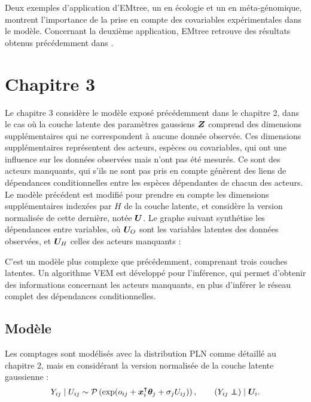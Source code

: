 Deux exemples d'application d'EMtree, un en écologie et un en méta-génomique, montrent l'importance de la prise en compte des covariables expérimentales dans le modèle. Concernant la deuxième application, EMtree retrouve des résultats obtenus précédemment dans \citet{jakuch}.


\section*{Chapitre 3}
Le chapitre 3 considère le modèle exposé précédemment dans le chapitre 2, dans le cas où la couche latente des paramètres gaussiens ${\boldsymbol{Z}}$ comprend des dimensions supplémentaires qui ne correspondent à aucune donnée observée. Ces dimensions supplémentaires représentent des acteurs, espèces ou covariables, qui ont une influence sur les données observées mais n'ont pas été mesurés. Ce sont des acteurs manquants, qui s'ils ne sont pas pris en compte génèrent des liens de dépendances conditionnelles entre les espèces dépendantes de chacun des acteurs. Le modèle précédent est modifié pour prendre en compte les dimensions supplémentaires indexées par $H$ de la couche latente, et considère la version normalisée de cette dernière, notée ${\boldsymbol{U}}$. Le graphe suivant synthétise les dépendances entre variables, où ${\boldsymbol{U}}_O$ sont les variables latentes des données observées, et ${\boldsymbol{U}}_H$ celles des acteurs manquants :

\begin{center}
\end{center}

C'est un modèle plus complexe que précédemment, comprenant trois couches latentes. Un algorithme VEM est développé pour l'inférence, qui permet d'obtenir des informations concernant les acteurs manquants, en plus d'inférer le réseau complet des dépendances conditionnelles.

\subsection*{Modèle}
Les comptages sont modélisés avec la distribution PLN comme détaillé au chapitre 2, mais en considérant la version normalisée de la couche latente gaussienne :
$$Y_{ij} \mid U_{ij} \sim \Pcal\left(\exp(o_{ij} + \xbf_i^\intercal \thetabf_j + \sigma_j U_{ij})\right), \qquad (Y_{ij}\independent )\mid \Ubf_i.$$

